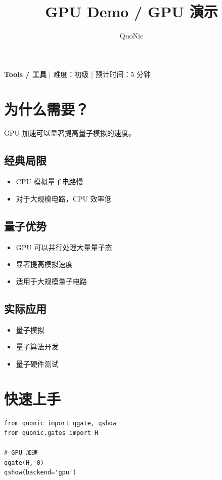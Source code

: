 \documentclass[12pt,a4paper]{article}
\title{GPU Demo / GPU 演示}
\author{QuoNic}
\date{}
\begin{document}
\maketitle

\begin{center}
\textbf{Tools / 工具} | 难度：初级 | 预计时间：5 分钟
\end{center}

\tableofcontents
\newpage

\section{为什么需要？}

GPU 加速可以显著提高量子模拟的速度。

\subsection{经典局限}
\begin{itemize}
  \item CPU 模拟量子电路慢
  \item 对于大规模电路，CPU 效率低
\end{itemize}

\subsection{量子优势}
\begin{itemize}
  \item GPU 可以并行处理大量量子态
  \item 显著提高模拟速度
  \item 适用于大规模量子电路
\end{itemize}

\subsection{实际应用}
\begin{itemize}
  \item 量子模拟
  \item 量子算法开发
  \item 量子硬件测试
\end{itemize}

\section{快速上手}

\begin{verbatim}
from quonic import qgate, qshow
from quonic.gates import H

# GPU 加速
qgate(H, 0)
qshow(backend='gpu')
\end{verbatim}
\end{document}

